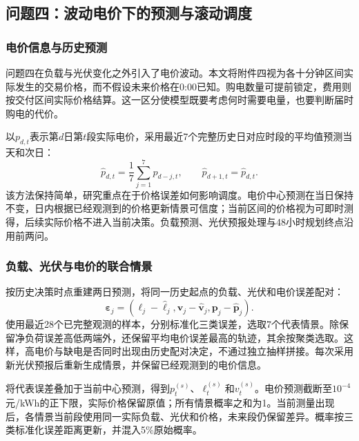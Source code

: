 \subsection{问题四：波动电价下的预测与滚动调度}
\subsubsection{电价信息与历史预测}
问题四在负载与光伏变化之外引入了电价波动。本文将附件四视为各十分钟区间实际发生的交易价格，而不假设未来价格在0:00已知。购电数量可提前锁定，费用则按交付区间实际价格结算。这一区分使模型既要考虑何时需要电量，也要判断届时购电的代价。

以$p_{d,t}$表示第$d$日第$t$段实际电价，采用最近7个完整历史日对应时段的平均值预测当天和次日：
\begin{equation}
\widehat p_{d,t}=\frac17\sum_{j=1}^{7}p_{d-j,t},\qquad
\widehat p_{d+1,t}=\widehat p_{d,t}.
\label{eq:q4priceforecast}
\end{equation}
该方法保持简单，研究重点在于价格误差如何影响调度。电价中心预测在当日保持不变，日内根据已经观测到的价格更新情景可信度；当前区间的价格视为可即时测得，后续实际价格不进入当前决策。负载预测、光伏预报处理与48小时规划终点沿用前两问。

\subsubsection{负载、光伏与电价的联合情景}
按历史决策时点重建两日预测，将同一历史起点的负载、光伏和电价误差配对：
\begin{equation}
\boldsymbol\varepsilon_j=
\left(\boldsymbol\ell_j-\widehat{\boldsymbol\ell}_j,
\boldsymbol v_j-\widehat{\boldsymbol v}_j,
\boldsymbol p_j-\widehat{\boldsymbol p}_j\right).
\end{equation}
使用最近28个已完整观测的样本，分别标准化三类误差，选取7个代表情景。除保留净负荷误差高低两端外，还保留平均电价误差最高的轨迹，其余按聚类选取。这样，高电价与缺电是否同时出现由历史配对决定，不通过独立抽样拼接。每次采用新光伏预报后重新生成情景，并保留已经观测到的电价信息。

将代表误差叠加于当前中心预测，得到$p_t^{(s)}$、$\ell_t^{(s)}$和$v_t^{(s)}$。电价预测截断至$10^{-4}$元/kWh的正下限，实际价格保留原值；所有情景概率之和为1。当前测量出现后，各情景当前段使用同一实际负载、光伏和价格，未来段仍保留差异。概率按三类标准化误差距离更新，并混入5\%原始概率。

